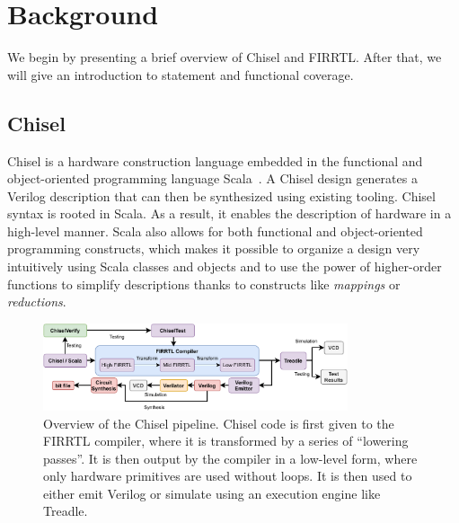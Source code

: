\documentclass[conference]{IEEEtran}
\newcommand{\martin}[1]{{\color{blue} Martin: #1}}
\begin{document}
\section{Background}
\label{sec:background}
We begin by presenting a brief overview of Chisel and FIRRTL. 
After that, we will give an introduction to statement and functional coverage.


\subsection{Chisel}
Chisel is a hardware construction language embedded in the functional and object-oriented programming language Scala~\cite{chisel:dac2012, chisel:book, Scala}. 
A Chisel design generates a Verilog description that can then be synthesized using existing tooling. 
Chisel syntax is rooted in Scala. As a result, it enables the description of hardware in a high-level manner. 
Scala also allows for both functional and object-oriented programming constructs, which makes it possible to organize a design very intuitively using Scala classes and objects and to use the power of higher-order functions to simplify descriptions thanks to constructs like \textit{mappings} or \textit{reductions}.

\begin{figure}[t]
    \centering
    \includegraphics[width=0.8\textwidth]{Chisel_FIRRTL_VERILOG.pdf}
    \caption{Overview of the Chisel pipeline. Chisel code is first given to the FIRRTL compiler, where it is transformed by a series of ``lowering passes''. It is then output by the compiler in a low-level form, where only hardware primitives are used without loops. It is then used to either emit Verilog or simulate using an execution engine like Treadle.}
\label{fig:chisel}
\end{figure}
\end{document}
